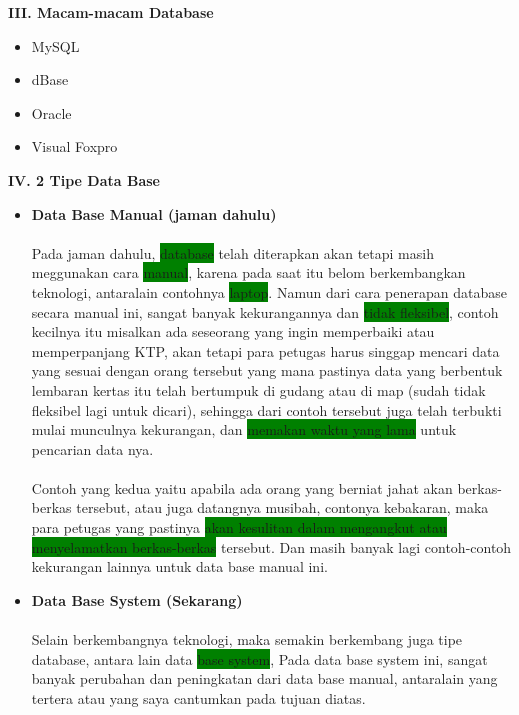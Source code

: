 \documentclass[a4paper,12pt]{article}
\newcommand{\hilight}[1]{\colorbox{green} {#1}}
\begin{document}
	\textbf{III. Macam-macam Database}
	\begin{itemize}
		\item MySQL 
		\item dBase
		\item Oracle
		\item Visual Foxpro
	\end{itemize}

	\vspace{0.8cm}
	
	\textbf{IV. 2 Tipe Data Base }\\
	\vspace{-0.3cm}
	\begin{itemize}
	\item \textbf{Data Base Manual (jaman dahulu) }
	\paragraph{}
		Pada jaman dahulu, \hilight{database} telah diterapkan akan tetapi masih meggunakan cara \hilight{manual}, karena pada saat itu belom berkembangkan teknologi, antaralain contohnya \hilight{laptop}. Namun dari cara penerapan database secara manual ini, sangat banyak kekurangannya dan \hilight{tidak fleksibel}, contoh kecilnya itu misalkan ada seseorang yang ingin memperbaiki atau memperpanjang KTP, akan tetapi para petugas harus singgap mencari data yang sesuai dengan orang tersebut yang mana pastinya data yang berbentuk lembaran kertas itu telah bertumpuk di gudang atau di map (sudah tidak fleksibel lagi untuk dicari), sehingga dari contoh tersebut juga telah terbukti mulai munculnya kekurangan, dan \hilight{memakan waktu yang lama} untuk pencarian data nya.
	  
	\paragraph{}
		Contoh yang kedua yaitu apabila ada orang yang berniat jahat akan berkas-berkas tersebut, atau juga datangnya musibah, contonya kebakaran, maka para petugas yang pastinya \hilight{akan kesulitan dalam mengangkut atau
		menyelamatkan berkas-berkas} tersebut. Dan masih banyak lagi contoh-contoh kekurangan lainnya untuk data base manual ini.
	
	\item\textbf{ Data Base System (Sekarang) }
	
	\paragraph{}
		Selain berkembangnya teknologi, maka semakin berkembang juga tipe database, antara lain data \hilight{base system}, Pada data base system ini, sangat banyak perubahan dan peningkatan dari data base manual, 
		antaralain yang tertera atau yang saya cantumkan pada tujuan diatas.
	\end{itemize}

	
\end{document}
